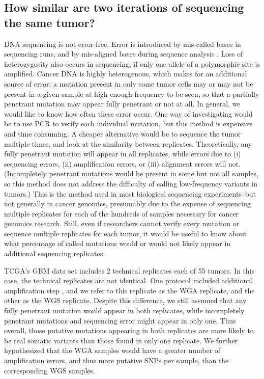 \documentclass[11pt]{article} %
\begin{document}
\subsection*{How similar are two iterations of sequencing the same tumor?}


DNA sequencing is not error-free. Error is introduced by mis-called bases in sequencing runs, and by mis-aligned bases during sequence analysis \citep{seqerror}. Loss of heterozygosity also occurs in sequencing, if only one allele of a polymorphic site is amplified. Cancer DNA is highly heterogenous, which makes for an additional source of error: a mutation present in only some tumor cells may or may not be present in a given sample at high enough frequency to be seen, so that a partially penetrant mutation may appear fully penetrant or not at all. In general, we would like to know how often these error occur. One way of investigating would be to use PCR to verify each individual mutation, but this method is expensive and time consuming. A cheaper alternative would be to sequence the tumor multiple times, and look at the similarity between replicates. Theoretically, any fully penetrant mutation will appear in all replicates, while errors due to (i) sequencing errors, (ii) amplification errors, or (iii) alignment errors will not. (Incompletely penetrant mutations would be present in some but not all samples, so this method does not address the difficulty of calling low-frequency variants in tumors.) This is the method used in most biological sequencing experiments--but not generally in cancer genomics, presumably due to the expense of sequencing multiple replicates for each of the hundreds of samples necessary for cancer genomics research. Still, even if researchers cannot verify every mutation or sequence multiple replicates for each tumor, it would be useful to know about what percentage of called mutations would or would not likely appear in additional sequencing replicates.

TCGA's GBM data set includes 2 technical replicates each of 55 tumors. In this case, the technical replicates are not identical. One protocol included additional amplification step \citep{TCGA}, and we refer to this replicate as the WGA replicate, and the other as the WGS replicate. Despite this difference, we still assumed that any fully penetrant mutation would appear in both replicates, while incompletely penetrant mutations and sequencing error might appear in only one. Thus overall, those putative mutations appearing in both replicates are more likely to be real somatic variants than those found in only one replicate. We further hypothesized that the WGA samples would have a greater number of amplification errors, and thus more putative SNPs per sample, than the corresponding WGS samples. 
\end{document}
